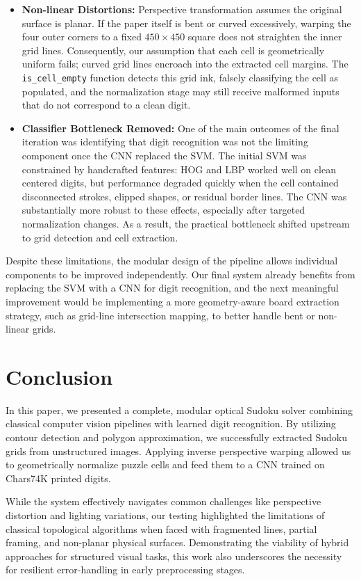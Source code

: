 \documentclass[10pt,twocolumn,letterpaper]{article}
\begin{document}
\begin{itemize}
\item \textbf{Non-linear Distortions:} Perspective transformation assumes the original surface is planar. If the paper itself is bent or curved excessively, warping the four outer corners to a fixed $450 \times 450$ square does not straighten the inner grid lines. Consequently, our assumption that each cell is geometrically uniform fails; curved grid lines encroach into the extracted cell margins. The \texttt{is\_cell\_empty} function detects this grid ink, falsely classifying the cell as populated, and the normalization stage may still receive malformed inputs that do not correspond to a clean digit.

\item \textbf{Classifier Bottleneck Removed:} One of the main outcomes of the final iteration was identifying that digit recognition was not the limiting component once the CNN replaced the SVM. The initial SVM was constrained by handcrafted features: HOG and LBP worked well on clean centered digits, but performance degraded quickly when the cell contained disconnected strokes, clipped shapes, or residual border lines. The CNN was substantially more robust to these effects, especially after targeted normalization changes. As a result, the practical bottleneck shifted upstream to grid detection and cell extraction.
\end{itemize}
Despite these limitations, the modular design of the pipeline allows individual components to be improved independently. Our final system already benefits from replacing the SVM with a CNN for digit recognition, and the next meaningful improvement would be implementing a more geometry-aware board extraction strategy, such as grid-line intersection mapping, to better handle bent or non-linear grids.


\section{Conclusion}
In this paper, we presented a complete, modular optical Sudoku solver combining classical computer vision pipelines with learned digit recognition. By utilizing contour detection and polygon approximation, we successfully extracted Sudoku grids from unstructured images. Applying inverse perspective warping allowed us to geometrically normalize puzzle cells and feed them to a CNN trained on Chars74K printed digits.

While the system effectively navigates common challenges like perspective distortion and lighting variations, our testing highlighted the limitations of classical topological algorithms when faced with fragmented lines, partial framing, and non-planar physical surfaces. Demonstrating the viability of hybrid approaches for structured visual tasks, this work also underscores the necessity for resilient error-handling in early preprocessing stages.
\end{document}
